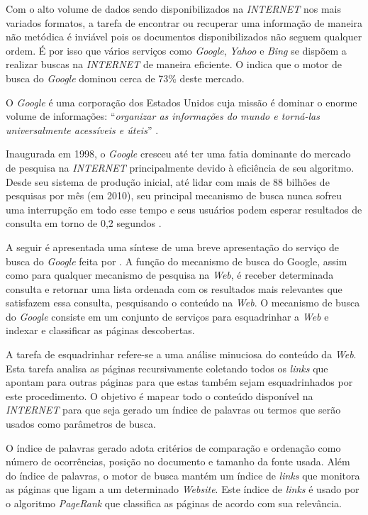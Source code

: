 Com o alto volume de dados sendo disponibilizados na \emph{INTERNET} nos mais variados formatos, a tarefa de encontrar ou recuperar uma informação de maneira não metódica é inviável pois os documentos disponibilizados não seguem qualquer ordem. É por isso que vários serviços como \emph{Google}, \emph{Yahoo} e \emph{Bing} se dispõem a realizar buscas na \emph{INTERNET} de maneira eficiente. O  indica que o motor de busca do \emph{Google} dominou cerca de 73\%  deste mercado.

O \emph{Google} é uma corporação dos Estados Unidos cuja missão é dominar o enorme volume de informações: ``\emph{organizar as informações do mundo e torná-las universalmente acessíveis e úteis}'' \cite{google}. 

Inaugurada em 1998, o \emph{Google} cresceu até ter uma fatia dominante do mercado de pesquisa na \emph{INTERNET} principalmente devido à eficiência de seu algoritmo. Desde seu sistema de produção inicial, até lidar com mais de 88 bilhões de pesquisas por mês (em 2010), seu principal mecanismo de busca nunca sofreu uma interrupção em todo esse tempo e seus usuários podem esperar resultados de consulta em torno de 0,2 segundos \cite{coulouris}.

A seguir é apresentada uma síntese de uma breve apresentação do serviço de busca do \emph{Google} feita por . A função do mecanismo de busca do Google, assim como para qualquer mecanismo de pesquisa na \emph{Web}, é receber determinada consulta e retornar uma lista ordenada com os resultados mais relevantes que satisfazem essa consulta, pesquisando o conteúdo na \emph{Web}. O mecanismo de busca do \emph{Google} consiste em um conjunto de serviços para esquadrinhar a \emph{Web} e indexar e classificar as páginas descobertas. 

A tarefa de esquadrinhar refere-se a uma análise minuciosa do conteúdo da \emph{Web}. Esta tarefa analisa as páginas recursivamente coletando todos os \emph{links} que apontam para outras páginas para que estas também sejam esquadrinhados por este procedimento. O objetivo é mapear todo o conteúdo disponível na \emph{INTERNET} para que seja gerado um índice de palavras ou termos que serão usados como parâmetros de busca.

O índice de palavras gerado adota critérios de comparação e ordenação como número de ocorrências, posição no documento e tamanho da fonte usada. Além do índice de palavras, o motor de busca mantém um índice de \emph{links} que monitora as páginas que ligam a um determinado \emph{Website}. Este índice de \emph{links} é usado por o algoritmo \emph{PageRank} que classifica as páginas de acordo com sua relevância. 

